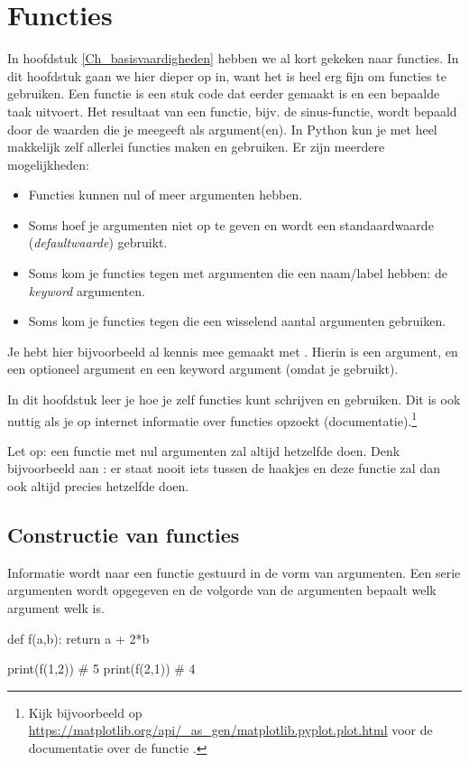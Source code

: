 \documentclass[a4paper,11pt, fleqn]{article}
\newcommand{\ditwc}{Naam van het huidige werkcollege}
\begin{document}
\clearpage
\renewcommand{\ditwc}{Functies}
\section[Functies]{\ditwc}
In hoofdstuk \ref{Ch_basisvaardigheden} hebben we al kort gekeken naar functies. In dit hoofdstuk gaan we hier dieper op in, want het is heel erg fijn om functies te gebruiken. Een functie is een stuk code dat eerder gemaakt is en een bepaalde taak uitvoert. Het resultaat van een functie, bijv. de sinus-functie, wordt bepaald door de waarden die je meegeeft als argument(en). In Python kun je met  heel makkelijk zelf allerlei functies maken en gebruiken. Er zijn meerdere mogelijkheden:

\begin{itemize}
\item Functies kunnen nul of meer argumenten hebben. 
\item Soms hoef je argumenten niet op te geven en wordt een standaardwaarde (\textit{defaultwaarde}) gebruikt.
\item Soms kom je functies tegen met argumenten die een naam/label hebben: de \textit{keyword} argumenten. 
\item Soms kom je functies tegen die een wisselend aantal argumenten gebruiken.
\end{itemize}

Je hebt  hier bijvoorbeeld al kennis mee gemaakt met . Hierin is  een argument,  en  een optioneel argument en  een keyword argument (omdat je  gebruikt).

In dit hoofdstuk leer je hoe je zelf functies kunt schrijven en gebruiken. Dit is ook nuttig als je op internet informatie over functies opzoekt (documentatie).\footnote{Kijk bijvoorbeeld op \url{https://matplotlib.org/api/_as_gen/matplotlib.pyplot.plot.html} voor de documentatie over de functie .}

Let op: een functie met nul argumenten zal altijd hetzelfde doen. Denk bijvoorbeeld aan : er staat nooit iets tussen de haakjes en deze functie zal dan ook altijd precies hetzelfde doen.

\subsection{Constructie van functies}
Informatie wordt naar een functie gestuurd in de vorm van argumenten. Een serie argumenten wordt opgegeven en de volgorde van de argumenten bepaalt welk argument welk is.
\begin{python}
def f(a,b):
    return a + 2*b
    
print(f(1,2)) # 5
print(f(2,1)) # 4
\end{python}
\end{document}
